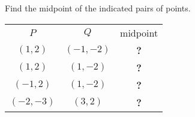 \begin{frame}
\begin{example}
Find the midpoint of the indicated pairs of points.
\begin{tabular}{ccc}
$P$ & $Q$ & midpoint\\
$(1,2)$& $(-1,-2)$&\textbf{?}\\
$(1,2)$& $(1,-2)$&\textbf{?}\\
$(-1,2)$& $(1,-2)$&\textbf{?}\\
$(-2,-3)$& $(3,2)$&\textbf{?}
\end{tabular}
\end{example}
\end{frame}